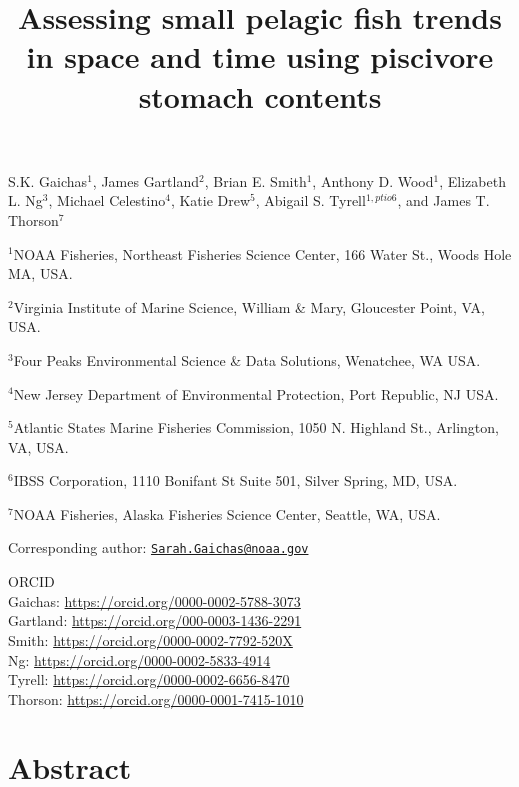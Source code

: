 \documentclass[
]{article}
\title{Assessing small pelagic fish trends in space and time using piscivore stomach contents}
\author{}
\date{\vspace{-2.5em}}
\begin{document}
\maketitle

S.K. Gaichas\(^{1}\), James Gartland\(^{2}\), Brian E. Smith\(^{1}\), Anthony D. Wood\(^{1}\), Elizabeth L. Ng\(^{3}\), Michael Celestino\(^{4}\), Katie Drew\(^{5}\), Abigail S. Tyrell\(^{1,ptio6}\), and James T. Thorson\(^{7}\)

\(^{1}\)NOAA Fisheries, Northeast Fisheries Science Center, 166 Water St., Woods Hole MA, USA.

\(^{2}\)Virginia Institute of Marine Science, William \& Mary, Gloucester Point, VA, USA.

\(^{3}\)Four Peaks Environmental Science \& Data Solutions, Wenatchee, WA USA.

\(^{4}\)New Jersey Department of Environmental Protection, Port Republic, NJ USA.

\(^{5}\)Atlantic States Marine Fisheries Commission, 1050 N. Highland St., Arlington, VA, USA.

\(^{6}\)IBSS Corporation, 1110 Bonifant St Suite 501, Silver Spring, MD, USA.

\(^{7}\)NOAA Fisheries, Alaska Fisheries Science Center, Seattle, WA, USA.

Corresponding author: \href{mailto:Sarah.Gaichas@noaa.gov}{\nolinkurl{Sarah.Gaichas@noaa.gov}}

ORCID\\
Gaichas: \url{https://orcid.org/0000-0002-5788-3073}\\
Gartland: \url{https://orcid.org/000-0003-1436-2291}\\
Smith: \url{https://orcid.org/0000-0002-7792-520X}\\
Ng: \url{https://orcid.org/0000-0002-5833-4914}\\
Tyrell: \url{https://orcid.org/0000-0002-6656-8470}\\
Thorson: \url{https://orcid.org/0000-0001-7415-1010}

\newpage

\hypertarget{abstract}{%
\section*{Abstract}\label{abstract}}
\end{document}
